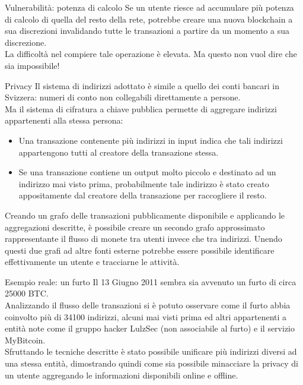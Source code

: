 \documentclass[italian]{beamer}
\begin{document}
\begin{frame}{Vulnerabilità: potenza di calcolo} %
 Se un utente riesce ad accumulare più potenza di calcolo di quella del resto della rete, potrebbe creare una nuova blockchain a sua discrezioni invalidando tutte le transazioni a partire da un momento a sua discrezione.\\
 \bigskip
 \pause
 La difficoltà nel compiere tale operazione è elevata.
 \bigskip
 \pause
 Ma questo non vuol dire che sia impossibile!
\end{frame}

\begin{frame}{Privacy} %
Il sistema di indirizzi adottato è simile a quello dei conti bancari in Svizzera: numeri di conto non collegabili direttamente a persone.\\
Ma il sistema di cifratura a chiave pubblica permette di aggregare indirizzi appartenenti alla stessa persona:
\begin{itemize}
 \item Una transazione contenente più indirizzi in input indica che tali indirizzi appartengono tutti al creatore della transazione stessa.
 \item Se una transazione contiene un output molto piccolo e destinato ad un indirizzo mai visto prima, probabilmente tale indirizzo è stato creato appositamente dal creatore della transazione per raccogliere il resto.
\end{itemize}
Creando un grafo delle transazioni pubblicamente disponibile e applicando le aggregazioni descritte, è possibile creare un secondo grafo approssimato rappresentante il flusso di monete tra utenti invece che tra indirizzi. Unendo questi due grafi ad altre fonti esterne potrebbe essere possibile identificare effettivamente un utente e tracciarne le attività.
\end{frame}

\begin{frame}{Esempio reale: un furto} %
Il 13 Giugno 2011 sembra sia avvenuto un furto di circa 25000 BTC.\\
Analizzando il flusso delle transazioni si è potuto osservare come il furto abbia coinvolto più di 34100 indirizzi, alcuni mai visti prima ed altri appartenenti a entità note come il gruppo hacker LulzSec (non associabile al furto) e il servizio MyBitcoin.\\
Sfruttando le tecniche descritte è stato possibile unificare più indirizzi diversi ad una stessa entità, dimostrando quindi come sia possibile minacciare la privacy di un utente aggregando le informazioni disponibili online e offline.
\end{frame}
\end{document}

